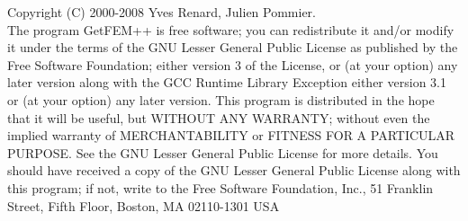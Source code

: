 Copyright (C) 2000-2008 Yves Renard, Julien Pommier.\\
The program GetFEM++ is free software; you can redistribute it and/or modify
it under the terms of the GNU Lesser General Public License as published by
the Free Software Foundation; either version 3 of the License, or
(at your option) any later version along with the GCC Runtime Library
Exception either version 3.1 or (at your option) any later version.
This program is distributed in the hope that it will be useful,
but WITHOUT ANY WARRANTY; without even the implied warranty of
MERCHANTABILITY or FITNESS FOR A PARTICULAR PURPOSE.  See the
GNU Lesser General Public License for more details.
You should have received a copy of the GNU  Lesser General Public License
along with this program; if not, write to the Free Software Foundation,
Inc., 51 Franklin Street, Fifth Floor, Boston, MA  02110-1301  USA